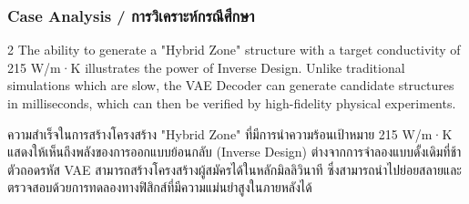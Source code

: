\subsubsection*{Case Analysis \quad / \quad \textthai{การวิเคราะห์กรณีศึกษา}}
\begin{paracol}{2}
The ability to generate a "Hybrid Zone" structure with a target conductivity of 215 W/m·K illustrates the power of Inverse Design. Unlike traditional simulations which are slow, the VAE Decoder can generate candidate structures in milliseconds, which can then be verified by high-fidelity physical experiments.

\switchcolumn

\begin{thai}
ความสำเร็จในการสร้างโครงสร้าง "Hybrid Zone" ที่มีการนำความร้อนเป้าหมาย 215 W/m·K แสดงให้เห็นถึงพลังของการออกแบบย้อนกลับ (Inverse Design) ต่างจากการจำลองแบบดั้งเดิมที่ช้า ตัวถอดรหัส VAE สามารถสร้างโครงสร้างผู้สมัครได้ในหลักมิลลิวินาที ซึ่งสามารถนำไปย่อยสลายและตรวจสอบด้วยการทดลองทางฟิสิกส์ที่มีความแม่นยำสูงในภายหลังได้
\end{thai}
\end{paracol}
